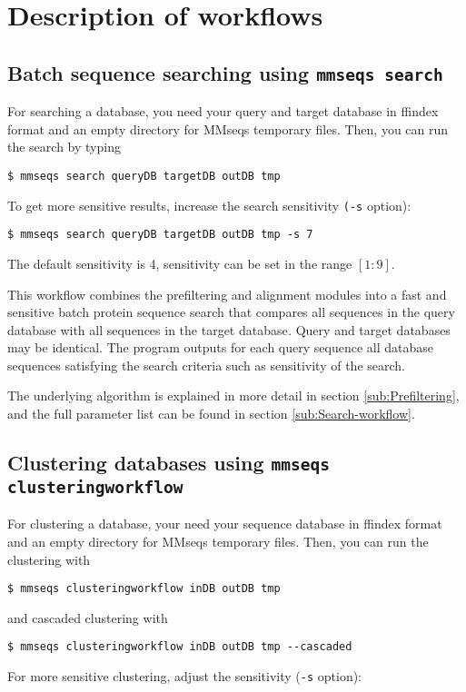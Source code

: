 \documentclass[11pt,a4paper]{report}
\begin{document}
\section{Description of workflows}


\subsection{Batch sequence searching using \texttt{mmseqs search}}

For searching a database, you need your query and target database
in ffindex format and an empty directory for MMseqs temporary files.
Then, you can run the search by typing

\texttt{\$ mmseqs search queryDB targetDB outDB tmp}

To get more sensitive results, increase the search sensitivity \texttt{(-s}
option):

\texttt{\$ mmseqs search queryDB targetDB outDB tmp -s 7}

The default sensitivity is 4, sensitivity can be set in the range
$[1:9]$.

This workflow combines the prefiltering and alignment modules into
a fast and sensitive batch protein sequence search that compares all
sequences in the query database with all sequences in the target database\emph{.
}Query and target databases may be identical. The program outputs
for each query sequence all database sequences satisfying the search
criteria such as sensitivity of the search.

The underlying algorithm is explained in more detail in section \ref{sub:Prefiltering},
and the full parameter list can be found in section \ref{sub:Search-workflow}.


\subsection{Clustering databases using \texttt{mmseqs clusteringworkflow}\label{sub:Clustering}}

For clustering a database, your need your sequence database in ffindex
format and an empty directory for MMseqs temporary files. Then, you
can run the clustering with

\texttt{\$ mmseqs clusteringworkflow inDB outDB tmp}

and cascaded clustering with

\texttt{\$ mmseqs clusteringworkflow inDB outDB tmp -{}-cascaded}

For more sensitive clustering, adjust the sensitivity (\texttt{-s}
option):
\end{document}
